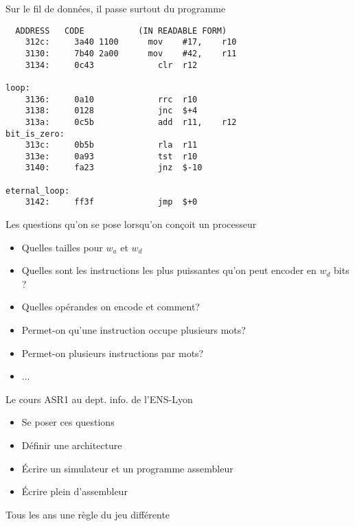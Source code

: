 \documentclass[slidetop,11pt,table]{beamer}
\begin{document}
\begin{frame}[fragile]{Sur le fil de données, il passe surtout du programme}
\begin{verbatim}
  ADDRESS   CODE           (IN READABLE FORM) 
    312c:	  3a40 1100      mov	#17,	r10	
    3130:	  7b40 2a00      mov	#42,	r11	
    3134:	  0c43       	   clr	r12		

loop:
    3136:	  0a10       	   rrc	r10		
    3138:	  0128       	   jnc	$+4      
    313a:	  0c5b       	   add	r11,	r12	
bit_is_zero:
    313c:	  0b5b       	   rla	r11		
    313e:	  0a93       	   tst	r10		
    3140:	  fa23       	   jnz	$-10     	

eternal_loop:
    3142:	  ff3f       	   jmp	$+0      	
\end{verbatim}
\end{frame}


\begin{frame}{Les questions qu'on se pose lorsqu'on conçoit un processeur}
  \begin{itemize}
  \item Quelles tailles pour $w_a$ et $w_d$
  \item Quelles sont les instructions les plus puissantes qu'on peut encoder en $w_d$ bits ?
  \item Quelles opérandes on encode et comment?
    
  \item Permet-on qu'une instruction occupe plusieurs mots?
  \item Permet-on plusieurs instructions par mots?
  \item ...
    
  \end{itemize}
\end{frame}

\begin{frame}{Le cours ASR1 au dept. info. de l'ENS-Lyon}
  \begin{itemize}
  \item Se poser ces questions
  \item Définir une architecture
  \item Écrire un simulateur et un programme assembleur
  \item Écrire plein d'assembleur
  \end{itemize}
  Tous les ans une règle du jeu différente 
\end{frame}
\end{document}

